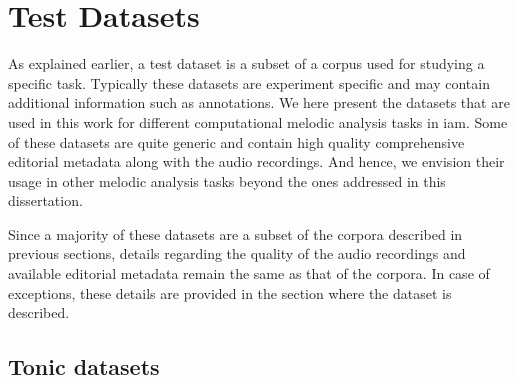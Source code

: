 




\section{Test Datasets}
\label{sec:corpus_test_datasets}

As explained earlier, a test dataset is a subset of a corpus used for studying a specific task. Typically these datasets are experiment specific and may contain additional information such as annotations. We here present the datasets that are used in this work for different computational melodic analysis tasks in \gls{iam}. Some of these datasets are quite generic and contain high quality comprehensive editorial metadata along with the audio recordings. And hence, we envision their usage in other melodic analysis tasks beyond the ones addressed in this dissertation.

Since a majority of these datasets are a subset of the corpora described in previous sections, details regarding the quality of the audio recordings and available editorial metadata remain the same as that of the corpora. In case of exceptions, these details are provided in the section where the dataset is described. 


\subsection{Tonic datasets}
\label{sec:corpus_tonic_datasets}



